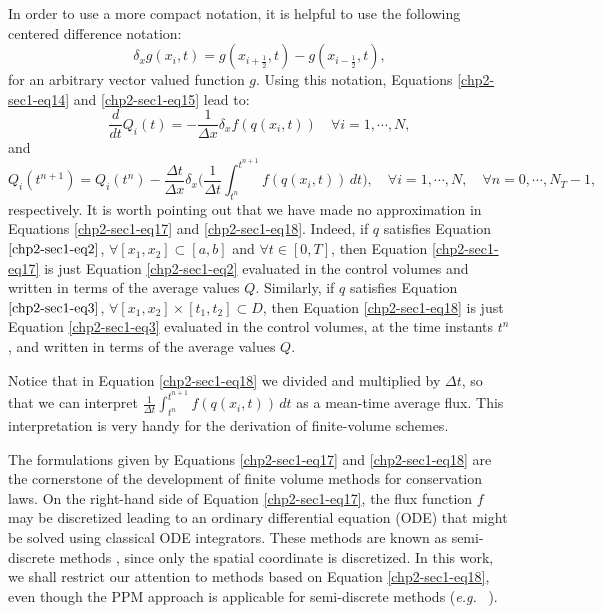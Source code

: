 In order to use a more compact notation, it is helpful to use the following centered difference notation:
\begin{equation}
	\label{chp2-sec1-eq16}
	\delta_x {g}(x_i,t) = 
	{g}(x_{i+\frac{1}{2}},t) - 
	{g}(x_{i-\frac{1}{2}},t),
\end{equation}
for an arbitrary vector valued function ${g}$. 
Using this notation, Equations \eqref{chp2-sec1-eq14}
and \eqref{chp2-sec1-eq15} lead to:
\begin{equation}
        \label{chp2-sec1-eq17}
        \frac{d}{dt} {Q}_i(t) = -\frac{1}{\Delta x}
	\delta_x {f}({q}(x_{i},t))
        \quad \forall i = 1, \cdots, N,
\end{equation}
and
\begin{equation}
        \label{chp2-sec1-eq18}
        {Q}_i(t^{n+1}) =  {Q}_i(t^{n}) -
	\frac{\Delta t}{  \Delta x} \delta _x\bigg( \frac{1}{\Delta t}\int_{t^{n}}^{t^{n+1}}
        {f}({q}(x_{i}, t)) \,dt \bigg),
        \quad \forall i = 1, \cdots, N,
        \quad \forall n = 0, \cdots, N_T-1,
\end{equation}
respectively.
It is worth pointing out that we have made no approximation in Equations
\eqref{chp2-sec1-eq17} and \eqref{chp2-sec1-eq18}. Indeed, if ${q}$ satisfies Equation
$\eqref{chp2-sec1-eq2}$, $\forall [x_1, x_2] \subset [a,b]$ and $\forall t \in [0,T]$,
then Equation \eqref{chp2-sec1-eq17} is just Equation
\eqref{chp2-sec1-eq2} evaluated in the control volumes and written
in terms of the average values ${Q}$. 
Similarly, if ${q}$ satisfies Equation
$\eqref{chp2-sec1-eq3}$, $\forall [x_1, x_2] \times [t_1, t_2] \subset D$,
then Equation \eqref{chp2-sec1-eq18} is just Equation
\eqref{chp2-sec1-eq3} evaluated in the control volumes,
at the time instants $t^{n}$, and written
in terms of the average values ${Q}$.

Notice that in Equation \eqref{chp2-sec1-eq18} we divided and multiplied by $\Delta t$, so that 
we can interpret $\frac{1}{\Delta t}\int_{t^{n}}^{t^{n+1}}
{f}({q}(x_{i}, t)) \,dt $ as a mean-time average flux.
This interpretation is very handy for the derivation of finite-volume schemes.

The formulations given by Equations \eqref{chp2-sec1-eq17} and \eqref{chp2-sec1-eq18} are the cornerstone 
of the development of finite volume methods for conservation laws. 
On the right-hand side of Equation \eqref{chp2-sec1-eq17}, the flux function ${f}$ 
may be discretized leading to an ordinary differential equation (ODE)
that might be solved using classical ODE integrators.
These methods are known as semi-discrete methods \citep{leveque:2002}, since only the spatial coordinate is discretized.
In this work, we shall restrict our attention to methods based on Equation \eqref{chp2-sec1-eq18},
even though the PPM approach is applicable for semi-discrete methods (\textit{e.g.} \ \citet{suresh:1997}).

